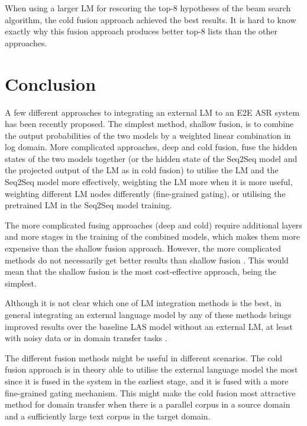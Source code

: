 \documentclass[11pt]{article}
\begin{document}
When using a larger LM for rescoring the top-8 hypotheses of the beam search algorithm, the cold fusion approach achieved the best results. It is hard to know exactly why this fusion approach produces better top-8 lists than the other approaches.


\section{Conclusion}



A few different approaches to integrating an external LM to an E2E ASR system has been recently proposed. The simplest method, shallow fusion, is to combine the output probabilities of the two models by a weighted linear combination in log domain. More complicated approaches, deep and cold fusion, fuse the hidden states of the two models together (or the hidden state of the Seq2Seq model and the projected output of the LM as in cold fusion) to utilise the LM and the Seq2Seq model more effectively, weighting the LM more when it is more useful, weighting different LM nodes differently (fine-grained gating), or utilising the pretrained LM in the Seq2Seq model training.

The more complicated fusing approaches (deep and cold) require additional layers and more stages in the training of the combined models, which makes them more expensive than the shallow fusion approach. However, the more complicated methods do not necessarily get better results than shallow fusion \citep{toshniwal2018comparison}. This would mean that the shallow fusion is the most cost-effective approach, being the simplest.

Although it is not clear which one of LM integration methods is the best, in general integrating an external language model by any of these methods brings improved results over the baseline LAS model without an external LM, at least with noisy data or in domain transfer tasks  \citep{toshniwal2018comparison, sriram2017cold, Mcdermott}.

The different fusion methods might be useful in different scenarios. The cold fusion approach is in theory able to utilise the external language model the most since it is fused in the system in the earliest stage, and it is fused with a more fine-grained gating mechanism. This might make the cold fusion most attractive method for domain transfer when there is a parallel corpus in a source domain and a sufficiently large text corpus in the target domain.






\end{document}
